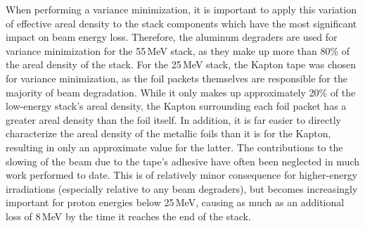 When performing  a variance minimization, it is important to apply this variation of effective areal density  to the stack components which  have the most significant impact on beam energy loss.
Therefore, the aluminum degraders are used for variance minimization for the 55\,MeV stack, as they make up more than 80\% of the areal density of the stack.
For the 25\,MeV stack, the Kapton tape was chosen for variance minimization, as the foil packets themselves are responsible for the majority of beam degradation.
While it only makes up approximately 20\% of the low-energy stack's areal density, the Kapton surrounding each foil packet has a greater areal density than the foil itself.
In addition, it is far easier to directly characterize the areal density of the metallic foils than it is for the Kapton, resulting in only an approximate value for the latter.
The contributions to the slowing of the beam due to the tape's adhesive have often been neglected in much work performed to date. 
This is of relatively minor consequence for higher-energy irradiations (especially relative to any beam degraders), but 
becomes increasingly important for proton energies below 
25\,MeV, causing as much as an additional loss of 8\,MeV  by the time it reaches the end of the stack.






